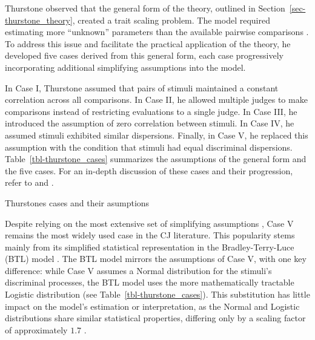 \documentclass[
  authoryear,
  preprint,
  1p]{elsarticle}
\begin{document}
Thurstone observed that the general form of the theory, outlined in
Section~\ref{sec-thurstone_theory}, created a trait scaling problem. The
model required estimating more ``unknown'' parameters than the available
pairwise comparisons \citep[pp.~267]{Thurstone_1927b}. To address this
issue and facilitate the practical application of the theory, he
developed five cases derived from this general form, each case
progressively incorporating additional simplifying assumptions into the
model.

In Case I, Thurstone assumed that pairs of stimuli maintained a constant
correlation across all comparisons. In Case II, he allowed multiple
judges to make comparisons instead of restricting evaluations to a
single judge. In Case III, he introduced the assumption of zero
correlation between stimuli. In Case IV, he assumed stimuli exhibited
similar dispersions. Finally, in Case V, he replaced this assumption
with the condition that stimuli had equal discriminal dispersions.
Table~\ref{tbl-thurstone_cases} summarizes the assumptions of the
general form and the five cases. For an in-depth discussion of these
cases and their progression, refer to \citet{Thurstone_1927b} and
\citet[pp.~248--253]{Bramley_2008}.

\begin{table}

\caption{\label{tbl-thurstone_cases}Thurstones cases and their
asumptions}


\end{table}%

Despite relying on the most extensive set of simplifying assumptions
\citetext{\citealp[pp.~253]{Bramley_2008}; \citealp[pp.~677]{Kelly_et_al_2022}},
Case V remains the most widely used case in the CJ literature. This
popularity stems mainly from its simplified statistical representation
in the Bradley-Terry-Luce (BTL) model
\citep{Bradley_et_al_1952, Luce_1959}. The BTL model mirrors the
assumptions of Case V, with one key difference: while Case V assumes a
Normal distribution for the stimuli's discriminal processes, the BTL
model uses the more mathematically tractable Logistic distribution
\citep[pp.~254]{Andrich_1978, Bramley_2008} (see
Table~\ref{tbl-thurstone_cases}). This substitution has little impact on
the model's estimation or interpretation, as the Normal and Logistic
distributions share similar statistical properties, differing only by a
scaling factor of approximately \(1.7\)
\citep[pp.~16]{vanderLinden_et_al_2017_I}.
\end{document}
